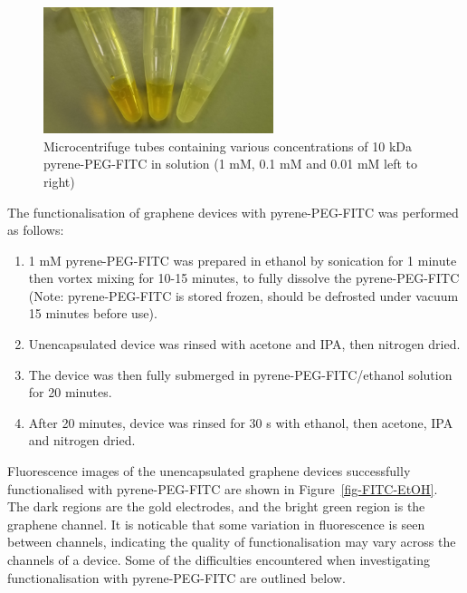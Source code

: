 \documentclass[
  a4paper,
]{scrbook}
\begin{document}
\begin{figure}

{\centering \includegraphics[width=0.6\textwidth,height=\textheight]{figures/ch6/PPF_vials.png}

}

\caption{\label{fig-PPF-concs}Microcentrifuge tubes containing various
concentrations of 10 kDa pyrene-PEG-FITC in solution (1 mM, 0.1 mM and
0.01 mM left to right)}

\end{figure}

The functionalisation of graphene devices with pyrene-PEG-FITC was
performed as follows:

\begin{enumerate}
\def\labelenumi{\arabic{enumi}.}
\item
  1 mM pyrene-PEG-FITC was prepared in ethanol by sonication for 1
  minute then vortex mixing for 10-15 minutes, to fully dissolve the
  pyrene-PEG-FITC (Note: pyrene-PEG-FITC is stored frozen, should be
  defrosted under vacuum 15 minutes before use).
\item
  Unencapsulated device was rinsed with acetone and IPA, then nitrogen
  dried.
\item
  The device was then fully submerged in pyrene-PEG-FITC/ethanol
  solution for 20 minutes.
\item
  After 20 minutes, device was rinsed for 30 s with ethanol, then
  acetone, IPA and nitrogen dried.
\end{enumerate}

Fluorescence images of the unencapsulated graphene devices successfully
functionalised with pyrene-PEG-FITC are shown in
Figure~\ref{fig-FITC-EtOH}. The dark regions are the gold electrodes,
and the bright green region is the graphene channel. It is noticable
that some variation in fluorescence is seen between channels, indicating
the quality of functionalisation may vary across the channels of a
device. Some of the difficulties encountered when investigating
functionalisation with pyrene-PEG-FITC are outlined below.
\end{document}
